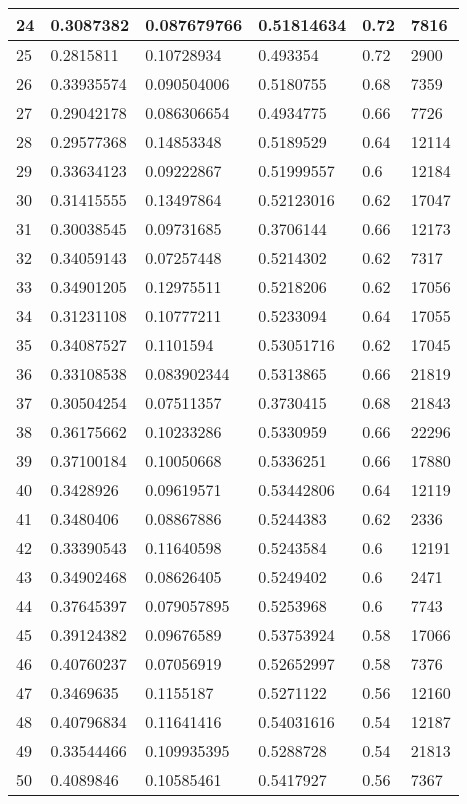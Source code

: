 \begin{longtable}{|l|l|l|l|l|l|}
24 & 0.3087382 & 0.087679766 & 0.51814634 & 0.72 & 7816 \\ \hline 
25 & 0.2815811 & 0.10728934 & 0.493354 & 0.72 & 2900 \\ \hline 
26 & 0.33935574 & 0.090504006 & 0.5180755 & 0.68 & 7359 \\ \hline 
27 & 0.29042178 & 0.086306654 & 0.4934775 & 0.66 & 7726 \\ \hline 
28 & 0.29577368 & 0.14853348 & 0.5189529 & 0.64 & 12114 \\ \hline 
29 & 0.33634123 & 0.09222867 & 0.51999557 & 0.6 & 12184 \\ \hline 
30 & 0.31415555 & 0.13497864 & 0.52123016 & 0.62 & 17047 \\ \hline 
31 & 0.30038545 & 0.09731685 & 0.3706144 & 0.66 & 12173 \\ \hline 
32 & 0.34059143 & 0.07257448 & 0.5214302 & 0.62 & 7317 \\ \hline 
33 & 0.34901205 & 0.12975511 & 0.5218206 & 0.62 & 17056 \\ \hline 
34 & 0.31231108 & 0.10777211 & 0.5233094 & 0.64 & 17055 \\ \hline 
35 & 0.34087527 & 0.1101594 & 0.53051716 & 0.62 & 17045 \\ \hline 
36 & 0.33108538 & 0.083902344 & 0.5313865 & 0.66 & 21819 \\ \hline 
37 & 0.30504254 & 0.07511357 & 0.3730415 & 0.68 & 21843 \\ \hline 
38 & 0.36175662 & 0.10233286 & 0.5330959 & 0.66 & 22296 \\ \hline 
39 & 0.37100184 & 0.10050668 & 0.5336251 & 0.66 & 17880 \\ \hline 
40 & 0.3428926 & 0.09619571 & 0.53442806 & 0.64 & 12119 \\ \hline 
41 & 0.3480406 & 0.08867886 & 0.5244383 & 0.62 & 2336 \\ \hline 
42 & 0.33390543 & 0.11640598 & 0.5243584 & 0.6 & 12191 \\ \hline 
43 & 0.34902468 & 0.08626405 & 0.5249402 & 0.6 & 2471 \\ \hline 
44 & 0.37645397 & 0.079057895 & 0.5253968 & 0.6 & 7743 \\ \hline 
45 & 0.39124382 & 0.09676589 & 0.53753924 & 0.58 & 17066 \\ \hline 
46 & 0.40760237 & 0.07056919 & 0.52652997 & 0.58 & 7376 \\ \hline 
47 & 0.3469635 & 0.1155187 & 0.5271122 & 0.56 & 12160 \\ \hline 
48 & 0.40796834 & 0.11641416 & 0.54031616 & 0.54 & 12187 \\ \hline 
49 & 0.33544466 & 0.109935395 & 0.5288728 & 0.54 & 21813 \\ \hline 
50 & 0.4089846 & 0.10585461 & 0.5417927 & 0.56 & 7367 \\ \hline 
\end{longtable}